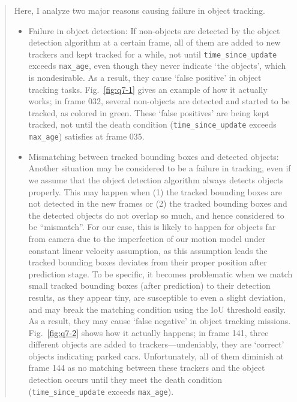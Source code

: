 \documentclass[11pt]{article}
\begin{document}
\begin{quote}
Here, I analyze two major reasons causing failure in object tracking.
\begin{itemize}
    \item Failure in object detection: If non-objects are detected by the object detection algorithm at a certain frame, all of them are added to new trackers and kept tracked for a while, not until \texttt{time\_since\_update} exceeds \texttt{max\_age}, even though they never indicate `the objects', which is nondesirable.  As a result, they cause `false positive' in object tracking tasks. Fig.~\ref{fig:q7-1} gives an example of how it actually works; in frame 032, several non-objects are detected and started to be tracked, as colored in green. These `false positives' are being kept tracked, not until the death condition (\texttt{time\_since\_update} exceeds \texttt{max\_age}) satisfies at frame 035. 
    \item Mismatching between tracked bounding boxes and detected objects: Another situation may be considered to be a failure in tracking, even if we assume that the object detection algorithm always detects objects properly. This may happen when (1) the tracked bounding boxes are not detected in the new frames or (2) the tracked bounding boxes and the detected objects do not overlap so much, and hence considered to be ``mismatch''. For our case, this is likely to happen for objects far from camera due to the imperfection of our motion model under constant linear velocity assumption, as this assumption leads the tracked bounding boxes deviates from their proper position after prediction stage. To be specific, it becomes problematic when we match small tracked bounding boxes (after prediction) to their detection results, as they appear tiny, are susceptible to even a slight deviation, and may break the matching condition using the IoU threshold easily. As a result, they may cause `false negative' in object tracking missions. Fig.~\ref{fig:q7-2} shows how it actually happens; in frame 141, three different objects are added to trackers---undeniably, they are `correct' objects indicating parked cars. Unfortunately, all of them diminish at frame 144 as no matching between these trackers and the object detection occurs until they meet the death condition (\texttt{time\_since\_update} exceeds \texttt{max\_age}).
\end{itemize}


\end{quote}
\end{document}

